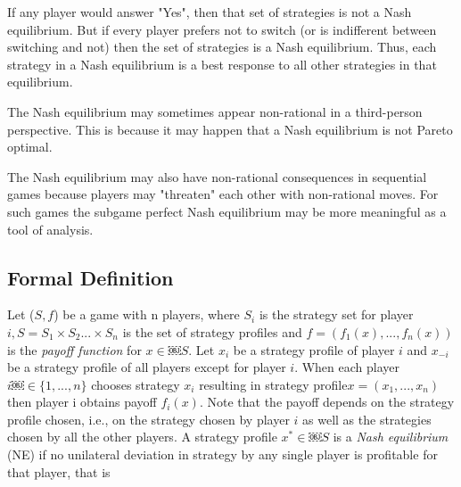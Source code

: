 \documentclass[twocolumn]{article}
\begin{document}
If any player would answer "Yes", then that set of strategies is not a Nash equilibrium. But if every player prefers not to switch (or is indifferent between switching and not) then the set of strategies is a Nash equilibrium. Thus, each strategy in a Nash equilibrium is a best response to all other strategies in that equilibrium.

The Nash equilibrium may sometimes appear non-rational in a third-person perspective. This is because it may happen that a Nash equilibrium is not Pareto optimal.

The Nash equilibrium may also have non-rational consequences in sequential games because players may "threaten" each other with non-rational moves. For such games the subgame perfect Nash equilibrium may be more meaningful as a tool of analysis.

\subsection{Formal Definition}
Let ($S, f$) be a game with n players, where $S_i$ is the strategy set for player $i, S=S_1 \times S_2 ... \times S_n$ is the set of strategy profiles and $f=(f_1(x), ..., f_n(x))$ is the \emph{payoff function} for $x \in￼ S$. Let $x_i$ be a strategy profile of player $i$ and $x_{-i}$ be a strategy profile of all players except for player $i$. When each player $i ￼ \in \{1, ..., n\}$ chooses strategy $x_i$ resulting in strategy profile$ x = (x_1, ..., x_n)$ then player i obtains payoff $f_i(x)$. Note that the payoff depends on the strategy profile chosen, i.e., on the strategy chosen by player $i$ as well as the strategies chosen by all the other players. A strategy profile $x^* \in ￼ S$ is a \emph{Nash equilibrium} (NE) if no unilateral deviation in strategy by any single player is profitable for that player, that is








































\end{document}
